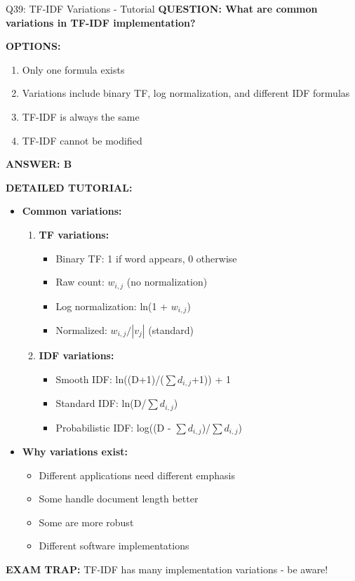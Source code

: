 \documentclass[8pt]{beamer}
\begin{document}
	\begin{frame}{Q39: TF-IDF Variations - Tutorial}
		\fontsize{6.5}{7.5}\selectfont
		\textbf{QUESTION: What are common variations in TF-IDF implementation?}
		
		\vspace{0.1cm}
		\textbf{OPTIONS:}
		\begin{enumerate}
			\item Only one formula exists
			\item Variations include binary TF, log normalization, and different IDF formulas
			\item TF-IDF is always the same
			\item TF-IDF cannot be modified
		\end{enumerate}
		
		\vspace{0.1cm}
		\textcolor{myblue}{\textbf{ANSWER: B}}
		
		\vspace{0.1cm}
		\textbf{DETAILED TUTORIAL:}
		\begin{itemize}
			\item \textbf{Common variations:}
			\begin{enumerate}
				\item \textbf{TF variations:}
				\begin{itemize}
					\item Binary TF: 1 if word appears, 0 otherwise
					\item Raw count: $w_{i,j}$ (no normalization)
					\item Log normalization: ln(1 + $w_{i,j}$)
					\item Normalized: $w_{i,j} / |v_j|$ (standard)
				\end{itemize}
				\item \textbf{IDF variations:}
				\begin{itemize}
					\item Smooth IDF: ln((D+1)/($\sum d_{i,j}$+1)) + 1
					\item Standard IDF: ln(D/$\sum d_{i,j}$)
					\item Probabilistic IDF: log((D - $\sum d_{i,j}$)/$\sum d_{i,j}$)
				\end{itemize}
			\end{enumerate}
			\item \textbf{Why variations exist:}
			\begin{itemize}
				\item Different applications need different emphasis
				\item Some handle document length better
				\item Some are more robust
				\item Different software implementations
			\end{itemize}
		\end{itemize}
		
		\textcolor{myred}{\textbf{EXAM TRAP:}} TF-IDF has \textcolor{myblue}{many implementation variations} - be aware!
	\end{frame}
	
\end{document}
